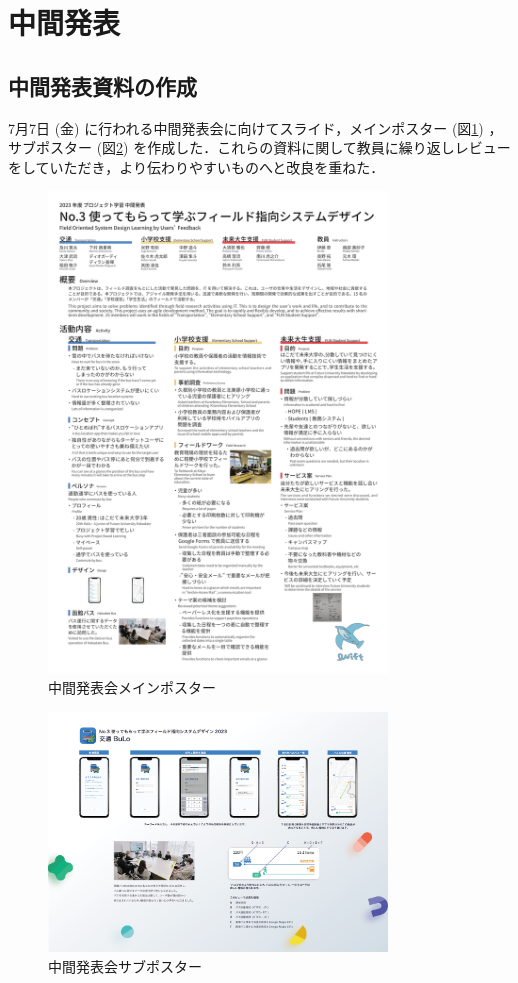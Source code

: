 \section{中間発表}
\subsection{中間発表資料の作成}
7月7日 (金) に行われる中間発表会に向けてスライド，メインポスター (図\ref{fig:interim_poster}) ，サブポスター (図\ref{fig:interim_poster_bulo}) を作成した．これらの資料に関して教員に繰り返しレビューをしていただき，より伝わりやすいものへと改良を重ねた．

\begin{figure}[htbp]
    \centering
    \includegraphics[width=9cm]{images/interim_poster.png}
    \caption{中間発表会メインポスター}
    \label{fig:interim_poster}
\end{figure}

\begin{figure}[htbp]
    \centering
    \includegraphics[width=9cm]{images/interim_poster_bulo.png}
    \caption{中間発表会サブポスター}
    \label{fig:interim_poster_bulo}
\end{figure}
\pagebreak
